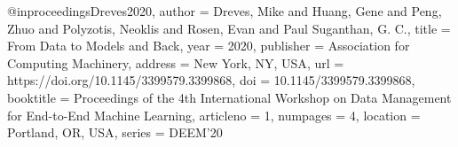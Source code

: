 @inproceedings{Dreves2020,
author = {Dreves, Mike and Huang, Gene and Peng, Zhuo and Polyzotis, Neoklis and Rosen, Evan and Paul Suganthan, G. C.},
title = {From Data to Models and Back},
year = {2020},
publisher = {Association for Computing Machinery},
address = {New York, NY, USA},
url = {https://doi.org/10.1145/3399579.3399868},
doi = {10.1145/3399579.3399868},
booktitle = {Proceedings of the 4th International Workshop on Data Management for End-to-End Machine Learning},
articleno = {1},
numpages = {4},
location = {Portland, OR, USA},
series = {DEEM'20}
}